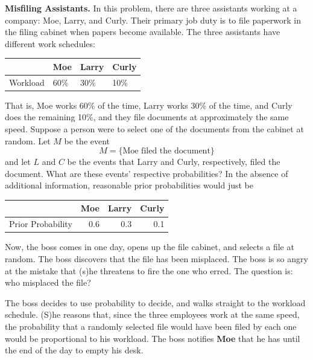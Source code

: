 \documentclass[captions=tableheading]{scrbook}
\begin{document}
\begin{example}
\label{exa:misfiling-assistants}
\textbf{Misfiling Assistants.} In this problem, there are three assistants working at a company: Moe, Larry, and Curly. Their primary job duty is to file paperwork in the filing cabinet when papers become available. The three assistants have different work schedules:

\begin{center}
\begin{tabular}{llll}
           &  Moe   &  Larry  &  Curly  \\
\hline
 Workload  &  60\%  &  30\%   &  10\%   \\
\end{tabular}
\end{center}


That is, Moe works 60\% of the time, Larry works 30\% of the time, and Curly does the remaining 10\%, and they file documents at approximately the same speed. Suppose a person were to select one of the documents from the cabinet at random. Let \(M\) be the event
\[
M= \{ \mbox{Moe filed the document} \}
\]
and let \(L\) and \(C\) be the events that Larry and Curly, respectively, filed the document. What are these events' respective probabilities? In the absence of additional information, reasonable prior probabilities would just be


\begin{center}
\begin{tabular}{lrrr}
                    &  Moe  &  Larry  &  Curly  \\
\hline
 Prior Probability  &  0.6  &    0.3  &    0.1  \\
\end{tabular}
\end{center}



Now, the boss comes in one day, opens up the file cabinet, and selects a file at random. The boss discovers that the file has been misplaced. The boss is so angry at the mistake that (s)he threatens to fire the one who erred. The question is: who misplaced the file?

The boss decides to use probability to decide, and walks straight to the workload schedule. (S)he reasons that, since the three employees work at the same speed, the probability that a randomly selected file would have been filed by each one would be proportional to his workload. The boss notifies \textbf{Moe} that he has until the end of the day to empty his desk.


\end{example}
\end{document}

